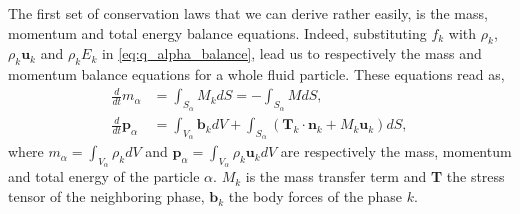 \documentclass[twocolumn]{My_article}
\newcommand{\ddt}{\frac{d}{d t}}
\begin{document}
The first set of conservation laws that we can derive rather easily, is  the mass, momentum and total energy balance equations. 
Indeed, substituting $f_k$ with $\rho_k$, $\rho_k \textbf{u}_k$ and $\rho_k E_k$  in \ref{eq:q_alpha_balance}, lead us to respectively the mass and momentum balance equations for a whole fluid particle.
These equations read as,
\begin{align}
    \label{eq:dt_m_alpha}
    \ddt m_\alpha 
    &= \int_{S_\alpha} M_k dS
    = - \int_{S_\alpha} M dS, \\
    \label{eq:dt_p_alpha}
    \ddt \textbf{p}_\alpha 
    &= \int_{V_\alpha} \textbf{b}_k dV
    + \int_{S_\alpha} \left(
    \textbf{T}_k\cdot\textbf{n}_k
    + M_k \textbf{u}_k
    \right)dS, 
\end{align}
where $m_\alpha =  \int_{V_\alpha} \rho_k dV$ and $\textbf{p}_\alpha= \int_{V_\alpha} \rho_k \textbf{u}_k dV$ are respectively the mass, momentum and total energy of the particle $\alpha$. 
$M_k$ is the mass transfer term and \textbf{T} the stress tensor of the neighboring phase, $\textbf{b}_k$ the body forces of the phase $k$. 
\end{document}
